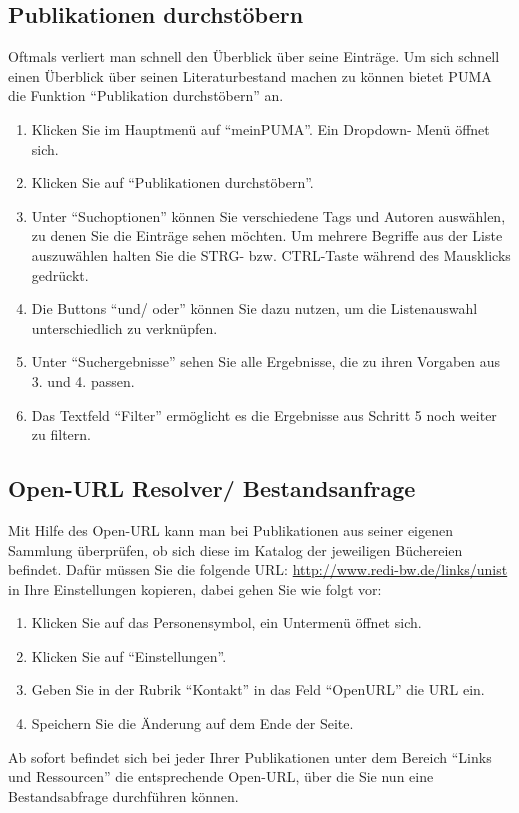 \documentclass[a4paper,11pt,twoside]{scrbook}
\begin{document}
\subsection{Publikationen durchstöbern}
Oftmals verliert man schnell den Überblick über seine Einträge. Um sich schnell einen Überblick über seinen Literaturbestand machen zu können bietet PUMA die Funktion \enquote{Publikation durchstöbern} an. 
\begin{enumerate}
    \item Klicken Sie im Hauptmenü auf \enquote{meinPUMA}. Ein Dropdown- Menü öffnet sich.
    \item Klicken Sie auf \enquote{Publikationen durchstöbern}.
    \item Unter \enquote{Suchoptionen} können Sie verschiedene Tags und Autoren auswählen, zu denen Sie die Einträge sehen möchten. Um mehrere Begriffe aus der Liste auszuwählen halten Sie die STRG- bzw. CTRL-Taste während des Mausklicks gedrückt.
    \item Die Buttons \enquote{und/ oder} können Sie dazu nutzen, um die Listenauswahl unterschiedlich zu verknüpfen. 
    \item Unter \enquote{Suchergebnisse} sehen Sie alle Ergebnisse, die zu ihren Vorgaben aus 3. und 4. passen.
    \item Das Textfeld \enquote{Filter} ermöglicht es die Ergebnisse aus Schritt 5 noch weiter zu filtern.
\end{enumerate}

\subsection{Open-URL Resolver/ Bestandsanfrage}
Mit Hilfe des Open-URL kann man bei Publikationen aus seiner eigenen Sammlung überprüfen, ob sich diese im Katalog der jeweiligen Büchereien befindet. Dafür müssen Sie  die folgende URL:  
\url{http://www.redi-bw.de/links/unist} in Ihre Einstellungen kopieren, dabei gehen Sie wie folgt vor:
\begin{enumerate}
    \item Klicken Sie auf das Personensymbol, ein Untermenü öffnet sich.
    \item Klicken Sie auf \enquote{Einstellungen}.
    \item Geben Sie in der Rubrik \enquote{Kontakt} in das Feld \enquote{OpenURL} die URL ein. 
    \item Speichern Sie die Änderung auf dem Ende der Seite.
\end{enumerate}
Ab sofort befindet sich bei jeder Ihrer Publikationen unter dem Bereich \enquote{Links und Ressourcen} die entsprechende Open-URL, über die Sie nun eine Bestandsabfrage durchführen können.
\end{document}
